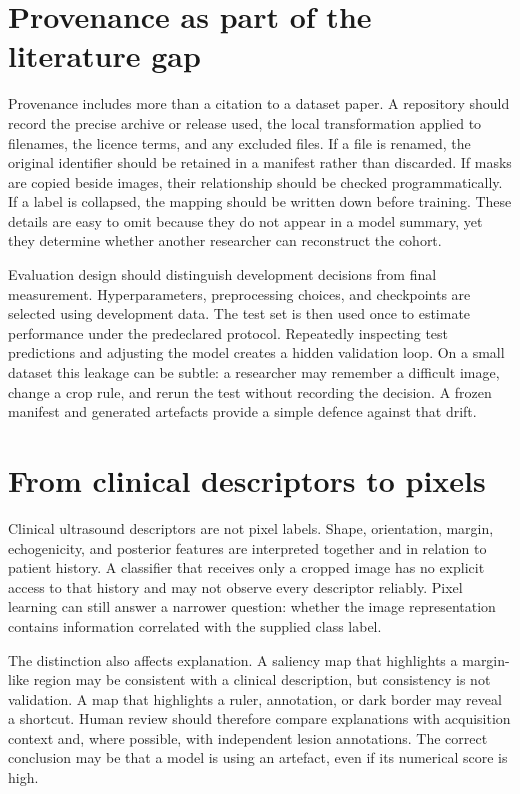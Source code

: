 \section{Provenance as part of the literature gap}
Provenance includes more than a citation to a dataset paper. A repository should record the precise archive or release used, the local transformation applied to filenames, the licence terms, and any excluded files. If a file is renamed, the original identifier should be retained in a manifest rather than discarded. If masks are copied beside images, their relationship should be checked programmatically. If a label is collapsed, the mapping should be written down before training. These details are easy to omit because they do not appear in a model summary, yet they determine whether another researcher can reconstruct the cohort.

Evaluation design should distinguish development decisions from final measurement. Hyperparameters, preprocessing choices, and checkpoints are selected using development data. The test set is then used once to estimate performance under the predeclared protocol. Repeatedly inspecting test predictions and adjusting the model creates a hidden validation loop. On a small dataset this leakage can be subtle: a researcher may remember a difficult image, change a crop rule, and rerun the test without recording the decision. A frozen manifest and generated artefacts provide a simple defence against that drift.

\section{From clinical descriptors to pixels}
Clinical ultrasound descriptors are not pixel labels. Shape, orientation, margin, echogenicity, and posterior features are interpreted together and in relation to patient history. A classifier that receives only a cropped image has no explicit access to that history and may not observe every descriptor reliably. Pixel learning can still answer a narrower question: whether the image representation contains information correlated with the supplied class label.

The distinction also affects explanation. A saliency map that highlights a margin-like region may be consistent with a clinical description, but consistency is not validation. A map that highlights a ruler, annotation, or dark border may reveal a shortcut. Human review should therefore compare explanations with acquisition context and, where possible, with independent lesion annotations. The correct conclusion may be that a model is using an artefact, even if its numerical score is high.

